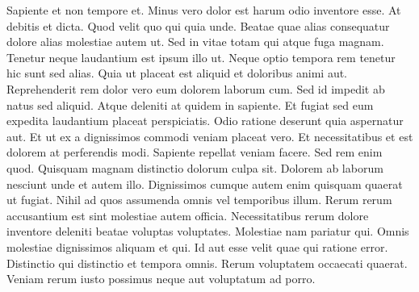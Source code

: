 Sapiente et non tempore et. Minus vero dolor est harum odio inventore esse. At
debitis et dicta. Quod velit quo qui quia unde. Beatae quae alias consequatur
dolore alias molestiae autem ut. Sed in vitae totam qui atque fuga magnam.
Tenetur neque laudantium est ipsum illo ut. Neque optio tempora rem tenetur hic
sunt sed alias. Quia ut placeat est aliquid et doloribus animi aut.
Reprehenderit rem dolor vero eum dolorem laborum cum. Sed id impedit ab natus
sed aliquid. Atque deleniti at quidem in sapiente. Et fugiat sed eum expedita
laudantium placeat perspiciatis. Odio ratione deserunt quia aspernatur aut. Et
ut ex a dignissimos commodi veniam placeat vero. Et necessitatibus et est
dolorem at perferendis modi. Sapiente repellat veniam facere. Sed rem enim
quod. Quisquam magnam distinctio dolorum culpa sit. Dolorem ab laborum nesciunt
unde et autem illo. Dignissimos cumque autem enim quisquam quaerat ut fugiat.
Nihil ad quos assumenda omnis vel temporibus illum. Rerum rerum accusantium est
sint molestiae autem officia. Necessitatibus rerum dolore inventore deleniti
beatae voluptas voluptates. Molestiae nam pariatur qui. Omnis molestiae
dignissimos aliquam et qui. Id aut esse velit quae qui ratione error.
Distinctio qui distinctio et tempora omnis. Rerum voluptatem occaecati quaerat.
Veniam rerum iusto possimus neque aut voluptatum ad porro.

\@openrighttrue\makeatother
